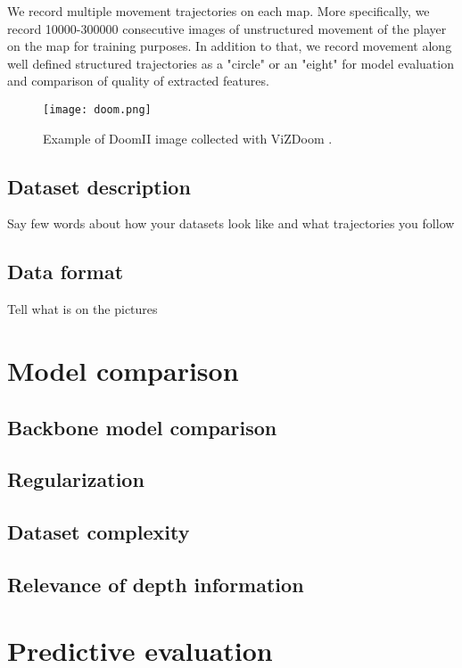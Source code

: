 We record multiple movement trajectories on each map.
More specifically, we record 10000-300000 consecutive images of unstructured movement of the player on the map for training purposes.
In addition to that, we record movement along well defined structured trajectories as a "circle" or an "eight" for model evaluation and comparison of quality of extracted features.


\begin{figure}
\centering
\texttt{[image: doom.png]} %
\caption{Example of DoomII image collected with ViZDoom \cite{Kempka2016}.}
\label{fig:doom}
\end{figure}

\subsection{Dataset description}

Say few words about how your datasets look like and what trajectories you follow

\subsection{Data format}

Tell what is on the pictures

\section{Model comparison}



\subsection{Backbone model comparison}


\subsection{Regularization}


\subsection{Dataset complexity}


\subsection{Relevance of depth information}


\section{Predictive evaluation}

